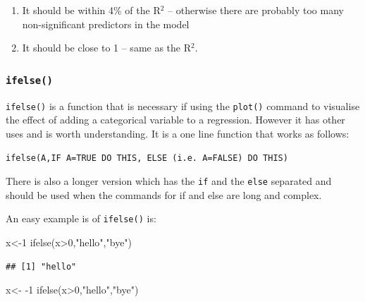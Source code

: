 \documentclass[
]{gitbook}
\newenvironment{Shaded}{\begin{snugshade}}{\end{snugshade}}
\newcommand{\DecValTok}[1]{\textcolor[rgb]{0.00,0.00,0.81}{#1}}
\newcommand{\FunctionTok}[1]{\textcolor[rgb]{0.00,0.00,0.00}{#1}}
\newcommand{\NormalTok}[1]{#1}
\newcommand{\OtherTok}[1]{\textcolor[rgb]{0.56,0.35,0.01}{#1}}
\newcommand{\SpecialCharTok}[1]{\textcolor[rgb]{0.00,0.00,0.00}{#1}}
\newcommand{\StringTok}[1]{\textcolor[rgb]{0.31,0.60,0.02}{#1}}
\providecommand{\tightlist}{%
  \setlength{\itemsep}{0pt}\setlength{\parskip}{0pt}}
\begin{document}
\begin{enumerate}
\def\labelenumi{\arabic{enumi}.}
\tightlist
\item
  It should be within 4\% of the R\(^2\) -- otherwise there are probably too many non-significant predictors in the model
\item
  It should be close to 1 -- same as the R\(^2\).
\end{enumerate}


\hypertarget{ifelse}{%
\subsubsection{\texorpdfstring{\texttt{ifelse()}}{ifelse()}}\label{ifelse}}

\texttt{ifelse()} is a function that is necessary if using the \texttt{plot()} command to visualise the effect of adding a categorical variable to a regression. However it has other uses and is worth understanding. It is a one line function that works as follows:

\texttt{ifelse(A,IF\ A=TRUE\ DO\ THIS,\ ELSE\ (i.e.\ A=FALSE)\ DO\ THIS)}

There is also a longer version which has the \texttt{if} and the \texttt{else} separated and should be used when the commands for if and else are long and complex.

An easy example is of \texttt{ifelse()} is:

\begin{Shaded}
\begin{Highlighting}[]
\NormalTok{x}\OtherTok{\textless{}{-}}\DecValTok{1}
\FunctionTok{ifelse}\NormalTok{(x}\SpecialCharTok{\textgreater{}}\DecValTok{0}\NormalTok{,}\StringTok{"hello"}\NormalTok{,}\StringTok{"bye"}\NormalTok{)}
\end{Highlighting}
\end{Shaded}

\begin{verbatim}
## [1] "hello"
\end{verbatim}

\begin{Shaded}
\begin{Highlighting}[]
\NormalTok{x}\OtherTok{\textless{}{-}} \SpecialCharTok{{-}}\DecValTok{1}
\FunctionTok{ifelse}\NormalTok{(x}\SpecialCharTok{\textgreater{}}\DecValTok{0}\NormalTok{,}\StringTok{"hello"}\NormalTok{,}\StringTok{"bye"}\NormalTok{)}
\end{Highlighting}
\end{Shaded}
\end{document}
